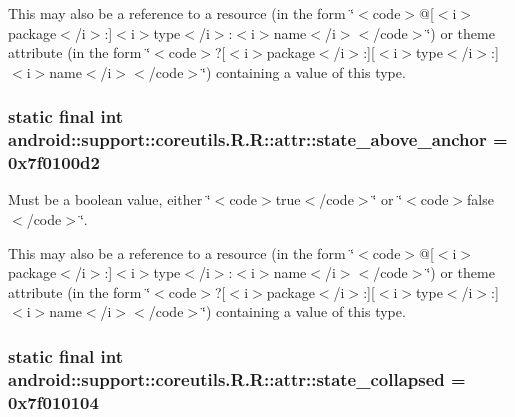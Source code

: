 This may also be a reference to a resource (in the form \char`\"{}$<$code$>$@\mbox{[}$<$i$>$package$<$/i$>$:\mbox{]}$<$i$>$type$<$/i$>$:$<$i$>$name$<$/i$>$$<$/code$>$\char`\"{}) or theme attribute (in the form \char`\"{}$<$code$>$?\mbox{[}$<$i$>$package$<$/i$>$:\mbox{]}\mbox{[}$<$i$>$type$<$/i$>$:\mbox{]}$<$i$>$name$<$/i$>$$<$/code$>$\char`\"{}) containing a value of this type. \hypertarget{classandroid_1_1support_1_1coreutils_1_1_r_1_1attr_690db2f579732162147ef4910f4edb10}{
\subsubsection[{state\_\-above\_\-anchor}]{\setlength{\rightskip}{0pt plus 5cm}static final int android::support::coreutils.R.R::attr::state\_\-above\_\-anchor = 0x7f0100d2}}
\label{classandroid_1_1support_1_1coreutils_1_1_r_1_1attr_690db2f579732162147ef4910f4edb10}


Must be a boolean value, either \char`\"{}$<$code$>$true$<$/code$>$\char`\"{} or \char`\"{}$<$code$>$false$<$/code$>$\char`\"{}. 

This may also be a reference to a resource (in the form \char`\"{}$<$code$>$@\mbox{[}$<$i$>$package$<$/i$>$:\mbox{]}$<$i$>$type$<$/i$>$:$<$i$>$name$<$/i$>$$<$/code$>$\char`\"{}) or theme attribute (in the form \char`\"{}$<$code$>$?\mbox{[}$<$i$>$package$<$/i$>$:\mbox{]}\mbox{[}$<$i$>$type$<$/i$>$:\mbox{]}$<$i$>$name$<$/i$>$$<$/code$>$\char`\"{}) containing a value of this type. \hypertarget{classandroid_1_1support_1_1coreutils_1_1_r_1_1attr_41c0b4fb742ce2a9b950e49db2d3b62c}{
\subsubsection[{state\_\-collapsed}]{\setlength{\rightskip}{0pt plus 5cm}static final int android::support::coreutils.R.R::attr::state\_\-collapsed = 0x7f010104}}
\label{classandroid_1_1support_1_1coreutils_1_1_r_1_1attr_41c0b4fb742ce2a9b950e49db2d3b62c}


